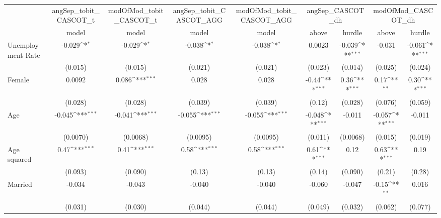 {
\def\sym#1{\ifmmode^{#1}\else\(^{#1}\)\fi}
\begin{tabular}{l*{8}{c}}
\hline\hline
               &\multicolumn{1}{c}{angSep\_tobit\_CASCOT\_t}&\multicolumn{1}{c}{modOfMod\_tobit\_CASCOT\_t}&\multicolumn{1}{c}{angSep\_tobit\_CASCOT\_AGG}&\multicolumn{1}{c}{modOfMod\_tobit\_CASCOT\_AGG}&\multicolumn{2}{c}{angSep\_CASCOT\_dh}&\multicolumn{2}{c}{modOfMod\_CASCOT\_dh}\\
               &   model         &   model         &   model         &   model         &   above         &  hurdle         &   above         &  hurdle         \\
\hline
Unemployment Rate&  -0.029\sym{*}  &  -0.029\sym{*}  &  -0.038\sym{*}  &  -0.038\sym{*}  &  0.0023         &  -0.039\sym{***}&  -0.031         &  -0.061\sym{***}\\
               & (0.015)         & (0.015)         & (0.021)         & (0.021)         & (0.023)         & (0.014)         & (0.025)         & (0.024)         \\
Female         &  0.0092         &   0.086\sym{***}&   0.028         &   0.028         &   -0.44\sym{***}&    0.36\sym{***}&    0.17\sym{**} &    0.30\sym{***}\\
               & (0.028)         & (0.028)         & (0.039)         & (0.039)         &  (0.12)         & (0.028)         & (0.076)         & (0.059)         \\
Age            &  -0.045\sym{***}&  -0.041\sym{***}&  -0.055\sym{***}&  -0.055\sym{***}&  -0.048\sym{***}&  -0.011         &  -0.057\sym{***}&  -0.011         \\
               &(0.0070)         &(0.0068)         &(0.0095)         &(0.0095)         & (0.011)         &(0.0068)         & (0.015)         & (0.019)         \\
Age squared    &    0.47\sym{***}&    0.41\sym{***}&    0.58\sym{***}&    0.58\sym{***}&    0.61\sym{***}&    0.12         &    0.63\sym{***}&    0.19         \\
               & (0.093)         & (0.090)         &  (0.13)         &  (0.13)         &  (0.14)         & (0.090)         &  (0.21)         &  (0.28)         \\
Married        &  -0.034         &  -0.043         &  -0.040         &  -0.040         &  -0.060         &  -0.047         &   -0.15\sym{**} &   0.016         \\
               & (0.031)         & (0.030)         & (0.044)         & (0.044)         & (0.049)         & (0.032)         & (0.062)         & (0.077)         \\

\end{tabular}}
